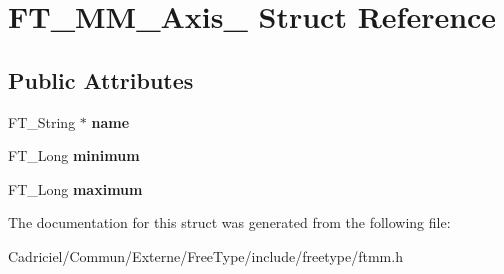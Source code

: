 \hypertarget{struct_f_t___m_m___axis__}{\section{F\-T\-\_\-\-M\-M\-\_\-\-Axis\-\_\- Struct Reference}
\label{struct_f_t___m_m___axis__}
}
\subsection*{Public Attributes}
\begin{DoxyCompactItemize}
\item 
\hypertarget{struct_f_t___m_m___axis___a5c784efa44906c0e2b715eb1f866a09f}{F\-T\-\_\-\-String $\ast$ {\bfseries name}}\label{struct_f_t___m_m___axis___a5c784efa44906c0e2b715eb1f866a09f}

\item 
\hypertarget{struct_f_t___m_m___axis___a9dc31f02b350b1356e0896673b5b73a4}{F\-T\-\_\-\-Long {\bfseries minimum}}\label{struct_f_t___m_m___axis___a9dc31f02b350b1356e0896673b5b73a4}

\item 
\hypertarget{struct_f_t___m_m___axis___addac1f8e71da1bedea9b393ae2751881}{F\-T\-\_\-\-Long {\bfseries maximum}}\label{struct_f_t___m_m___axis___addac1f8e71da1bedea9b393ae2751881}

\end{DoxyCompactItemize}


The documentation for this struct was generated from the following file\-:\begin{DoxyCompactItemize}
\item 
Cadriciel/\-Commun/\-Externe/\-Free\-Type/include/freetype/ftmm.\-h\end{DoxyCompactItemize}
